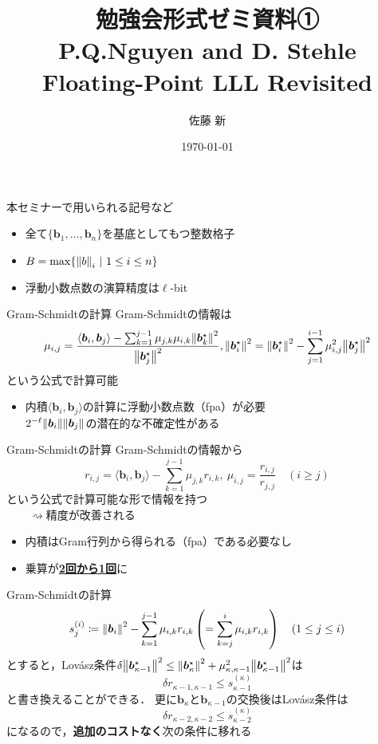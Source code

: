 \documentclass[12pt,aspectratio=169,xcolor=dvipsnames,table,dvipdfmx, leqno]{beamer}
\title[勉強会]{勉強会形式ゼミ資料①\\P.Q.Nguyen and D. Stehle Floating-Point LLL Revisited}
\author[佐藤]{佐藤 新}
\date{\today}
\begin{document}
\maketitle

\begin{frame}
    本セミナーで用いられる記号など
    \begin{itemize}
        \item 全て$\{\bm{b}_1,\ldots,\bm{b}_n\}$を基底としてもつ整数格子
        \item $B=\max\{\norm{b}_i~|~1\le i\le n\}$
        \item 浮動小数点数の演算精度は$\ell$-bit
    \end{itemize}
\end{frame}

\begin{frame}{Gram-Schmidtの計算}
    Gram-Schmidtの情報は
    \[
    \mu_{i, j}=\frac{\langle \bm{b}_i, \bm{b}_j\rangle-\sum_{k=1}^{j-1}\mu_{j, k}\mu_{i, k}\norm{\bm{b}_k^\star}^2}{\norm{\bm{b}_j^\star}^2}, \norm{\bm{b}_i^\star}^2=\norm{\bm{b}_i^\star}^2-\sum_{j=1}^{i-1}\mu_{i, j}^2\norm{\bm{b}_j^\star}^2
    \]
    という公式で計算可能

    \begin{itemize}
        \item 内積$\langle \bm{b}_i, \bm{b}_j\rangle$の計算に浮動小数点数（fpa）が必要\\
        \quad\quad $2^{-\ell}\norm{\bm{b}_i}\norm{\bm{b}_j}$の潜在的な不確定性がある
    \end{itemize}
\end{frame}

\begin{frame}{Gram-Schmidtの計算}
    Gram-Schmidtの情報から
    \[
    r_{i, j}=\langle \bm{b}_i, \bm{b}_j\rangle-\sum_{k=1}^{j-1}\mu_{j, k}r_{i, k},~\mu_{i, j}=\frac{r_{i, j}}{r_{j, j}}\quad(i\ge j)
    \]
    という公式で計算可能な形で情報を持つ\\
    $\quad\quad\rightsquigarrow$精度が改善される
    \begin{itemize}
        \item 内積はGram行列から得られる（fpa）である必要なし
        \item 乗算が\underline{\textbf{2回から1回}}に
    \end{itemize}
\end{frame}

\begin{frame}{Gram-Schmidtの計算}
\[
s_j^{(i)}\coloneqq \norm{\bm{b}_i}^2-\sum_{k=1}^{j-1}\mu_{i, k}r_{i, k}\left(=\sum_{k=j}^i\mu_{i, k}r_{i, k}\right)\quad(1\le j\le i)
\]
とすると，Lov\'asz条件$\delta\norm{\bm{b}_{\kappa-1}^\star}^2\le \norm{\bm{b}_\kappa^\star}^2+\mu_{\kappa, \kappa-1}^2\norm{\bm{b}_{\kappa-1}^\star}^2$は
\[
\delta r_{\kappa-1, \kappa-1}\le s_{\kappa-1}^{(\kappa)}
\]
と書き換えることができる．
更に$\bm{b}_{\kappa}$と$\bm{b}_{\kappa-1}$の交換後はLov\'asz条件は
\[
\delta r_{\kappa-2, \kappa-2}\le s_{\kappa-2}^{(\kappa)}
\]
になるので，\textbf{追加のコストなく}次の条件に移れる
\end{frame}
\end{document}
